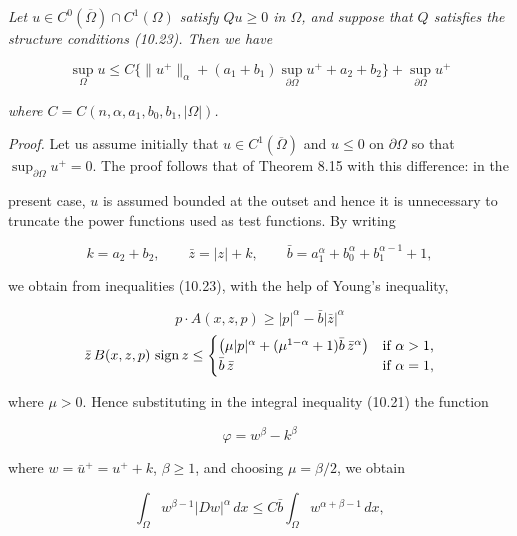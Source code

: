 \begin{lemma}\label{gilbarg-trudinger.lem.10.8.divergence-form-maximum-bound}
\textit{Let $u\in C^0(\overline{\Omega})\cap C^1(\Omega)$ satisfy $Qu\ge 0$ in $\Omega$, and suppose that $Q$ satisfies the structure conditions (10.23). Then we have}

\begin{equation}
\tag{10.24}
\sup_{\Omega}u\le C\{\|u^+\|_\alpha+(a_1+b_1)\sup_{\partial\Omega}u^++a_2+b_2\}+\sup_{\partial\Omega}u^+
\end{equation}

\textit{where $C=C(n,\alpha,a_1,b_0,b_1,|\Omega|)$.}
\end{lemma}

\textit{Proof.} Let us assume initially that $u\in C^1(\overline{\Omega})$ and $u\le 0$ on $\partial\Omega$ so that $\sup_{\partial\Omega}u^+=0$. The proof follows that of Theorem 8.15 with this difference: in the


present case, $u$ is assumed bounded at the outset and hence it is unnecessary to
truncate the power functions used as test functions. By writing

\[
k=a_2+b_2,\qquad \bar z=|z|+k,\qquad \bar b=a_1^{\alpha}+b_0^{\alpha}+b_1^{\alpha-1}+1,
\]

we obtain from inequalities (10.23), with the help of Young’s inequality,

\begin{equation}\tag{10.25}
p\cdot A(x,z,p)\ge |p|^{\alpha}-\bar b|\bar z|^{\alpha}
\end{equation}
\[
\bar z\,B(x,z,p)\,\operatorname{sign} z\le
\begin{cases}
\bigl(\mu |p|^{\alpha}+(\mu^{1-\alpha}+1)\bar b\,\bar z^{\alpha}\bigr) & \text{if $\alpha>1$,}\\
\bar b\,\bar z & \text{if $\alpha=1$,}
\end{cases}
\]

where $\mu>0$. Hence substituting in the integral inequality (10.21) the function

\[
\varphi=w^{\beta}-k^{\beta}
\]

where $w=\bar u^{+}=u^{+}+k$, $\beta\ge 1$, and choosing $\mu=\beta/2$, we obtain

\[
\int_{\Omega} w^{\beta-1}|Dw|^{\alpha}\,dx\le C\bar b \int_{\Omega} w^{\alpha+\beta-1}\,dx,
\]

